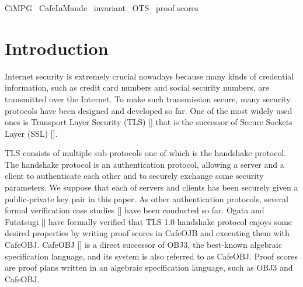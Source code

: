 \documentclass[a4paper,fleqn]{cas-dc}
\begin{document}


\begin{keywords}
 CiMPG \ CafeInMaude \ invariant \ OTS \ proof scores
\end{keywords}

\section{Introduction}\label{intro}
Internet security is extremely crucial nowadays because many kinds of credential information, such as credit card numbers and social security numbers, are transmitted over the Internet. To make such transmission secure, many security protocols have been designed and developed so far. One of the most widely used ones is Transport Layer Security (TLS) [\cite{dierk}] that is the successor of Secure Sockets Layer (SSL) [\cite{*1}]. 

TLS consists of multiple sub-protocols one of which is the handshake protocol. The handshake protocol is an authentication protocol, allowing a server and a client to authenticate each other and to securely exchange some security parameters. We suppose that each of servers and clients has been securely given a public-private key pair in this paper. As other authentication protocols, several formal verification case studies [\citep{article, 10.1145/3133956.3134063, 10.1145/967900.968063}] have been conducted so far. Ogata and Futatsugi [\cite{1437139}] have formally verified that TLS 1.0 handshake protocol enjoys some desired properties by writing proof scores in CafeOJB and executing them with CafeOBJ. CafeOBJ [\cite{DiaconescuF98amast}] is a direct successor of OBJ3, the best-known algebraic specification language, and its system is also referred to as CafeOBJ. Proof scores are proof plans written in an algebraic specification language, such as OBJ3 and CafeOBJ.
\end{document}
